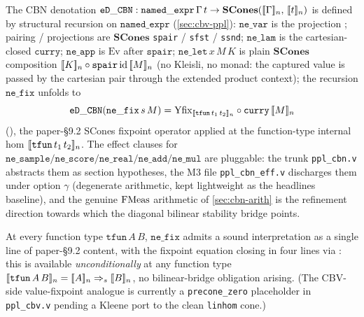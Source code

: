 \begin{definition}\label{def:cbn-eD}
\rocqok
{}\rocqok
{}
The CBN denotation
$\mathtt{eD\_CBN} : \mathtt{named\_expr}\,\Gamma\,t \to
\mathbf{SCones}([\![ \Gamma ]\!]_n,\,[\![ t ]\!]_n)$ is defined by
structural recursion on $\mathtt{named\_expr}$ (\autoref{sec:cbv-ppl}):
$\mathtt{ne\_var}$ is the projection
; pairing /
projections are $\mathbf{SCones}$ \texttt{spair} / \texttt{sfst} /
\texttt{ssnd}; $\mathtt{ne\_lam}$ is the cartesian-closed $\texttt{curry}$;
$\mathtt{ne\_app}$ is $\mathrm{Ev}$ after $\texttt{spair}$;
$\mathtt{ne\_let}\,x\,M\,K$ is plain $\mathbf{SCones}$ composition
$[\![ K ]\!]_n \circ \texttt{spair}\,\mathrm{id}\,[\![ M ]\!]_n$
(no Kleisli, no monad: the captured value is passed by the cartesian
pair through the extended product context); the recursion
$\mathtt{ne\_fix}$ unfolds to
\[
  \mathtt{eD\_CBN}(\mathtt{ne\_fix}\,s\,M)
  = \mathrm{Yfix}_{[\![ \mathtt{tfun}\,t_1\,t_2 ]\!]_n} \circ
     \mathtt{curry}\,[\![ M ]\!]_n
\]
(), the paper-\S9.2 SCones
fixpoint operator  applied at the
function-type internal hom $[\![ \mathtt{tfun}\,t_1\,t_2 ]\!]_n$. The
effect clauses for $\mathtt{ne\_sample}/\mathtt{ne\_score}/\mathtt{ne\_real}
/\mathtt{ne\_add}/\mathtt{ne\_mul}$ are pluggable: the trunk
\texttt{ppl\_cbn.v} abstracts them as section hypotheses, the M3 file
\texttt{ppl\_cbn\_eff.v} discharges them under option $\gamma$ (degenerate
arithmetic, kept lightweight as the headlines baseline), and the
genuine $\mathrm{FMeas}$ arithmetic of \autoref{sec:cbn-arith} is the refinement
direction towards which the diagonal bilinear stability bridge points.
\end{definition}

\begin{lemma}\label{lem:cbn-recursion}
\rocqok
{}
At every function type $\mathtt{tfun}\,A\,B$, $\mathtt{ne\_fix}$ admits a
sound interpretation as a single line of paper-\S9.2 content, with the
fixpoint equation closing in four lines via
: this is available
\emph{unconditionally} at any function type $[\![ \mathtt{tfun}\,A\,B ]\!]_n =
[\![ A ]\!]_n \Rightarrow_s [\![ B ]\!]_n$, no bilinear-bridge obligation
arising. (The CBV-side value-fixpoint analogue is currently a
\texttt{precone\_zero} placeholder in \texttt{ppl\_cbv.v} pending a
Kleene port to the clean \texttt{linhom} cone.)
\end{lemma}

